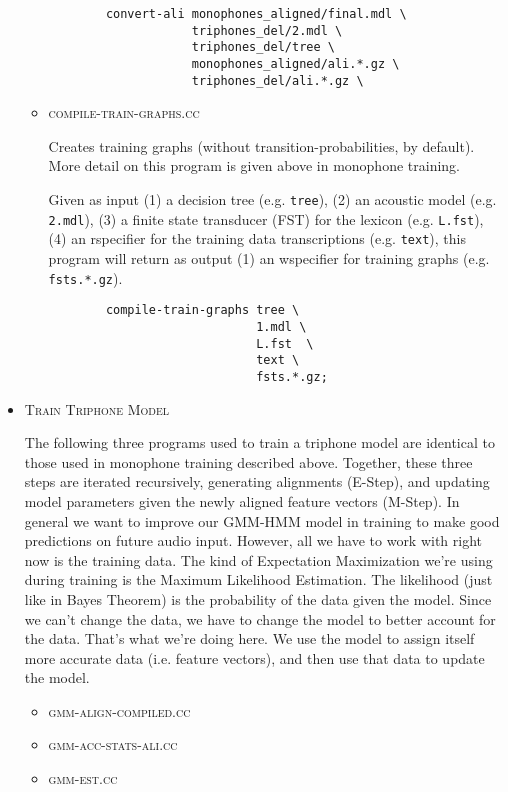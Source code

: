 \documentclass[10pt,a4paper]{article}
\begin{document}
\begin{itemize}
\begin{itemize}
   \begin{verbatim}
        convert-ali monophones_aligned/final.mdl \
                    triphones_del/2.mdl \
                    triphones_del/tree \
                    monophones_aligned/ali.*.gz \
                    triphones_del/ali.*.gz \
   \end{verbatim}

  \item \textsc{compile-train-graphs.cc}

   Creates training graphs (without transition-probabilities, by default). More detail on this program is given above in monophone training.
   
   Given as input (1) a decision tree (e.g. \texttt{tree}), (2) an acoustic model (e.g. \texttt{2.mdl}), (3) a finite state transducer (FST) for the lexicon (e.g. \texttt{L.fst}), (4) an rspecifier for the training data transcriptions (e.g. \texttt{text}), this program will return as output (1) an wspecifier for training graphs (e.g. \texttt{fsts.*.gz}).

   \begin{verbatim}
        compile-train-graphs tree \
                             1.mdl \
                             L.fst  \
                             text \
                             fsts.*.gz;
   \end{verbatim}



  \end{itemize}

\vspace{1cm}
\item \textsc{Train Triphone Model}

The following three programs used to train a triphone model are identical to those used in monophone training described above. Together, these three steps are iterated recursively, generating alignments (E-Step), and updating model parameters given the newly aligned feature vectors (M-Step). In general we want to improve our GMM-HMM model in training to make good predictions on future audio input. However, all we have to work with right now is the training data. The kind of Expectation Maximization we're using during training is the Maximum Likelihood Estimation. The likelihood (just like in Bayes Theorem) is the probability of the data given the model. Since we can't change the data, we have to change the model to better account for the data. That's what we're doing here. We use the model to assign itself more accurate data (i.e. feature vectors), and then use that data to update the model.

  \begin{itemize}
    \vspace{.25cm}
  \item \textsc{gmm-align-compiled.cc}
  \item \textsc{gmm-acc-stats-ali.cc}
  \item \textsc{gmm-est.cc}
  \end{itemize}


\end{itemize}
\end{document}
